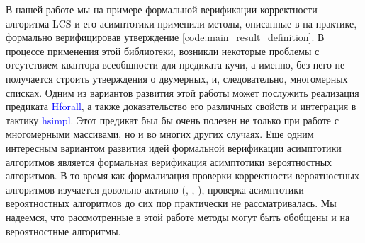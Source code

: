 В нашей работе мы на примере формальной верификации корректности алгоритма LCS и его асимптотики применили методы, описанные в \cite{base_article}
на практике, формально верифицировав утверждение \ref{code:main_result_definition}.
В процессе применения этой библиотеки, возникли некоторые проблемы с отсутствием квантора всеобщности для предиката кучи,
а именно, без него не получается строить утверждения о двумерных, и, следовательно, многомерных списках. Одним из вариантов развития
этой работы может послужить реализация предиката \textcolor{blue}{Hforall}, а также доказательство его различных свойств и интеграция в тактику
\textcolor{blue}{hsimpl}. Этот предикат был бы очень полезен не только при работе с многомерными массивами, но и во многих других случаях.
Еще одним интересным вариантом развития идей формальной верификации асимптотики алгоритмов является формальная верификация асимптотики
вероятностных алгоритмов. В то время как формализация проверки корректности вероятностных алгоритмов изучается довольно активно
(\cite{AUDEBAUD2009568}, \cite{tassarotti2017verifying}, \cite{10.1007/978-3-319-46750-4_5}), проверка асимптотики вероятностных алгоритмов
до сих пор практически не рассматривалась. Мы надеемся, что рассмотренные в этой работе методы могут быть обобщены и на вероятностные алгоритмы.

